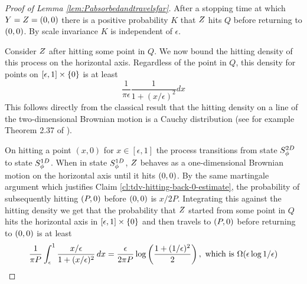 {\begin{proof}[Proof of Lemma \ref{lem:Pabsorbedandtravelsfar}]
After a stopping time at which $Y = Z = (0,0)$ there is a positive probability $K$
that $Z$ hits $Q$ before returning to $(0,0)$.
By scale invariance $K$ is independent of $\epsilon$.

Consider $Z$ after hitting some point in $Q$.  We now
bound the hitting density of this process on the horizontal
axis.  Regardless of the point in $Q$, this density for points on
$[\epsilon,1] \times \{0\}$ is at least
\[
\frac{1}{\pi\epsilon} \frac{1}{1 + (x/\epsilon)^2} dx
\]
This follows directly from the classical result that the hitting density
on a line of the two-dimensional Brownian motion is a Cauchy distribution
(see for example Theorem 2.37 of \cite{mortens-peres}).

On hitting a point $(x,0)$ for $x \in [\epsilon, 1]$ the process
transitions from state $S^{2D}_{\phi}$ to state $S^{1D}_{\phi}$.
When in state $S^{1D}_{\phi}$, $Z$ behaves as a
one-dimensional Brownian motion on the horizontal axis until it hits
$(0,0)$.
By the same martingale argument which justifies
Claim \ref{cl:tdv-hitting-back-0-estimate}, the
probability of subsequently hitting $(P,0)$ before $(0,0)$ is $x/2P$.
Integrating this against the hitting density we get that the probability that
$Z$ started from some point in $Q$ hits the horizontal axis in $[\epsilon,1] \times \{0\}$
and then travels to $(P,0)$ before returning
to $(0,0)$ is at least
\[
\frac{1}{\pi P} \int_{\epsilon}^{1} \frac{x/\epsilon}{1 + (x/\epsilon)^2}
\, dx
=
\frac{\epsilon}{2\pi P} \log\left(\frac{1 + (1/\epsilon)^2}{2}\right)
,\text{ which is }
\Omega(\epsilon\log 1/\epsilon)
\]
\end{proof}
}
